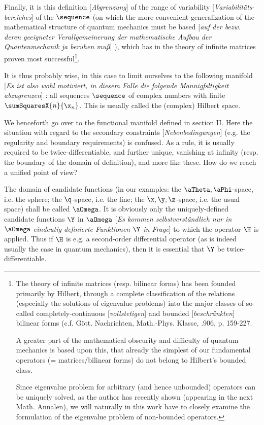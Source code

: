 \documentclass{article}
\newcommand{\WTF}[1]{
[\it{\small{#1}}]
}
\renewcommand{\it}[1]{\textit{#1}}
\begin{document}
Finally, it is this definition\WTF{Abgrenzung} of the range of variability\WTF{Variabilitäts-bereiches} of the $\sequence$ (on which the more convenient generalization of the mathematical structure of quantum mechanics must be based\WTF{auf der bezw. deren geeigneter Verallgemeinerung der mathematische Aufbau der Quantenmechanik ja beruhen muß}), which has in the theory of infinite matrices proven most successful\footnote{The theory of infinite matrices (resp. bilinear forms) has been founded primarily by Hilbert, through a complete classification of the relations (especially the solutions of eigenvalue problems) into the major classes of so-called completely-continuous\WTF{vollstetigen} and bounded\WTF{beschränkten} bilinear forms (c.f. Gött. Nachrichten, Math.-Phys. Klasse, .906, p. 159-227.

A greater part of the mathematical obscurity and difficulty of quantum mechanics is based upon this, that already the simplest of our fundamental operators (= matrices/bilinear forms) do not belong to Hilbert's bounded class.

Since eigenvalue problem for arbitrary (and hence unbounded) operators can be uniquely solved, as the author has recently shown (appearing in the next Math. Annalen), we will naturally in this work have to closely examine the formulation of the eigenvalue problem of non-bounded operators.}.


It is thus probably wise, in this case to limit ourselves to the following manifold\WTF{Es ist also wohl motiviert, in diesem Falle die folgende Mannigfsltigkeit abzugrenzen}: all sequences $\sequence$ of complex numbers with finite $\sumSquaresX{n}{\x_n}$. This is usually called the (complex) Hilbert space.

We henceforth go over to the functional manifold defined in section II. Here the situation with regard to the secondary constraints\WTF{Nebenbedingungen} (e.g. the regularity and boundary requirements) is confused. As a rule, it is usually required to be twice-differentiable, and further unique, vanishing at infinity (resp. the boundary of the domain of definition), and more like these. How do we reach a unified point of view?

The domain of candidate functions (in our examples: the $\aTheta,\aPhi$-space, i.e. the sphere; the $\q$-space, i.e. the line; the $\x,\y,\z$-space, i.e. the usual space) shall be called $\aOmega$. It is obviously only the uniquely-defined candidate functions $\Y$ in $\aOmega$\WTF{Es kommen selbstverständlich nur in $\aOmega$ eindeutig definierte Funktionen $\Y$ in Frage} to which the operator $\H$ is applied. Thus if $\H$ is e.g. a second-order differential operator (as is indeed usually the case in quantum mechanics), then it is essential that $\Y$ be twice-differentiable.
\end{document}

